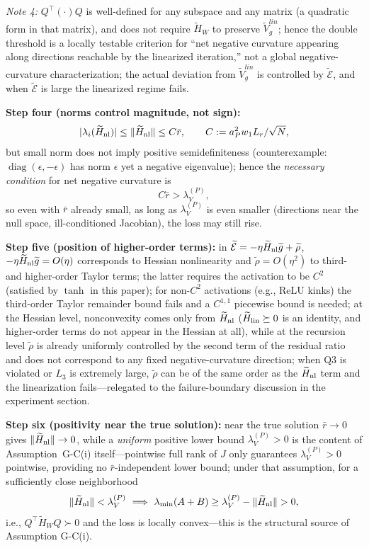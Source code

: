 \documentclass[11pt]{article}
\DeclarePairedDelimiter{\norm}{\lVert}{\rVert}
\newcommand{\W}{W}
\newcommand{\Erem}{\mathcal E}
\newcommand{\wt}[1]{\widetilde{#1}}
\DeclareMathOperator{\diag}{diag}
\numberwithin{equation}{section}
\begin{document}
\noindent\emph{Note 4:} $Q^\top(\cdot)Q$ is well-defined for any subspace and any matrix (a quadratic form in that matrix), and does not require $\wt H_{\W}$ to preserve $\wt V_g^{lin}$; hence the double threshold is a locally testable criterion for ``net negative curvature appearing along directions reachable by the linearized iteration,'' not a global negative-curvature characterization; the actual deviation from $\wt V_g^{lin}$ is controlled by $\wt\Erem$, and when $\wt\Erem$ is large the linearized regime fails.

\noindent\textbf{Step four (norms control magnitude, not sign):}
\begin{equation}
|\lambda_i(\wt H_{\rm nl})|\le\norm{\wt H_{\rm nl}}\le C\bar r,
\qquad C:=a_P^2w_1L_r/\sqrt N,
\end{equation}
but small norm does not imply positive semidefiniteness (counterexample: $\diag(\epsilon,-\epsilon)$ has norm $\epsilon$ yet a negative eigenvalue); hence the \emph{necessary condition} for net negative curvature is
\begin{equation}
C\bar r>\lambda_V^{(P)},
\end{equation}
so even with $\bar r$ already small, as long as $\lambda_V^{(P)}$ is even smaller (directions near the null space, ill-conditioned Jacobian), the loss may still rise.

\noindent\textbf{Step five (position of higher-order terms):} in $\wt\Erem=-\eta\wt H_{\rm nl}\wt g+\wt\rho$, $-\eta\wt H_{\rm nl}\wt g=O(\eta)$ corresponds to Hessian nonlinearity and $\wt\rho=O(\eta^2)$ to third- and higher-order Taylor terms; the latter requires the activation to be $C^2$ (satisfied by $\tanh$ in this paper); for non-$C^2$ activations (e.g., ReLU kinks) the third-order Taylor remainder bound fails and a $C^{1,1}$ piecewise bound is needed; at the Hessian level, nonconvexity comes only from $\wt H_{\rm nl}$ ($\wt H_{\rm lin}\succeq0$ is an identity, and higher-order terms do not appear in the Hessian at all), while at the recursion level $\wt\rho$ is already uniformly controlled by the second term of the residual ratio and does not correspond to any fixed negative-curvature direction; when Q3 is violated or $L_3$ is extremely large, $\wt\rho$ can be of the same order as the $\wt H_{\rm nl}$ term and the linearization fails---relegated to the failure-boundary discussion in the experiment section.

\noindent\textbf{Step six (positivity near the true solution):} near the true solution $\bar r\to0$ gives $\norm{\wt H_{\rm nl}}\to0$, while a \emph{uniform} positive lower bound $\lambda_V^{(P)}>0$ is the content of Assumption~G-C(i) itself---pointwise full rank of $J$ only guarantees $\lambda_V^{(P)}>0$ pointwise, providing no $\bar r$-independent lower bound; under that assumption, for a sufficiently close neighborhood
\begin{equation}
\norm{\wt H_{\rm nl}}<\lambda_V^{(P)}
\ \Longrightarrow\
\lambda_{\min}(A+B)\ge\lambda_V^{(P)}-\norm{\wt H_{\rm nl}}>0,
\end{equation}
i.e., $Q^\top\wt H_{\W}Q\succ0$ and the loss is locally convex---this is the structural source of Assumption G-C(i).
\end{document}

